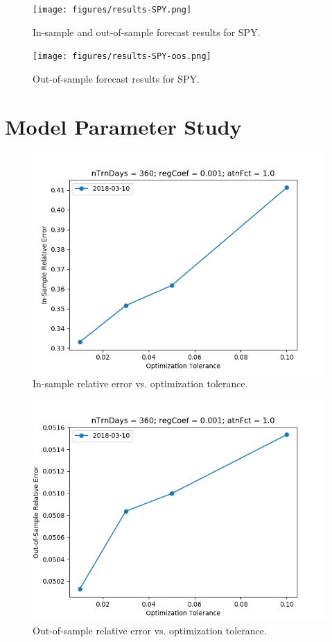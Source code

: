 \documentclass{article}
\begin{document}
\begin{figure}\label{fig:results-spy}
\texttt{[image: figures/results-SPY.png]}
\caption{In-sample and out-of-sample forecast results for SPY.}
\end{figure}

\begin{figure}\label{fig:results-spy-oos}
\texttt{[image: figures/results-SPY-oos.png]}
\caption{Out-of-sample forecast results for SPY.}
\end{figure}

\section{Model Parameter Study}\label{section:model-parameter-study}

\begin{figure}\label{fig:tolerance-sensitivity-error}
\includegraphics[bb=0 0 640 480]{figures/tolerance-sensitivity-error.png}
\caption{In-sample relative error vs. optimization tolerance.}
\end{figure}

\begin{figure}\label{fig:tolerance-sensitivity-oos-error}
\includegraphics[bb=0 0 640 480]{figures/tolerance-sensitivity-oos-error.png}
\caption{Out-of-sample relative error vs. optimization tolerance.}
\end{figure}
\end{document}
